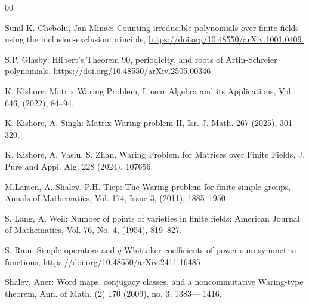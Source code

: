 \documentclass[preprint,11pt]{amsart}
\theoremstyle{definition}
\numberwithin{thm}{section}
\begin{document}
 
%
\begin{thebibliography}{00}



 Sunil K. Chebolu, Jan Minac: Counting irreducible polynomials over finite fields using the inclusion-exclusion principle, \url{https://doi.org/10.48550/arXiv.1001.0409.} 

 S.P. Glasby: Hilbert's Theorem $90$, periodicity, and roots of Artin-Schreier polynomials,  \url{https://doi.org/10.48550/arXiv.2505.00346}



 K. Kishore: Matrix Waring Problem, Linear Algebra and its Applications, Vol. 646, (2022), 84--94. 

 K. Kishore, A. Singh: Matrix Waring problem II, Isr. J. Math. 267 (2025), 301–320.  

 K. Kishore, A. Vasiu, S. Zhan, Waring Problem for Matrices over Finite Fields, J. Pure and Appl. Alg. 228 (2024), 107656.

  M.Larsen, A. Shalev, P.H. Tiep: The Waring problem for finite simple groups, Annals of Mathematics, Vol. 174, Issue 3, (2011), 1885--1950

 S. Lang, A. Weil: Number of points of varieties in finite fields: American Journal of Mathematics, Vol. 76, No. 4, (1954), 819--827.


 S. Ram: Simple operators and $q$-Whittaker coefficients of power sum symmetric functions, \url{https://doi.org/10.48550/arXiv.2411.16485}


 Shalev, Aner: Word maps, conjugacy classes, and a noncommutative Waring-type theorem, Ann. of Math. (2) 170 (2009), no. 3, 1383–– 1416.



\end{thebibliography}
\end{document}
